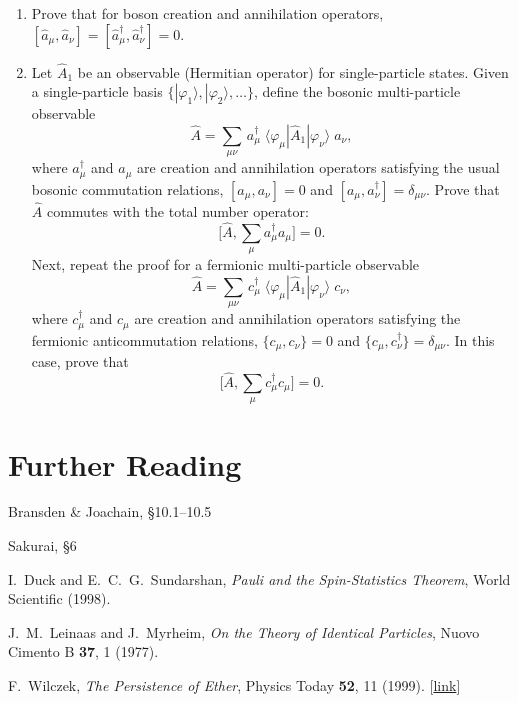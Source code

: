 \documentclass[prx,12pt]{revtex4-2}
\begin{document}
\begin{enumerate}
\item
  Prove that for boson creation and annihilation operators, $[\hat{a}_\mu,\hat{a}_\nu] = [\hat{a}_\mu^\dagger,\hat{a}_\nu^\dagger] = 0$.
  \label{ex:boson_commutators}

\item
  Let $\hat{A}_1$ be an observable (Hermitian operator) for
  single-particle states.  Given a single-particle basis
  $\{|\varphi_1\rangle,|\varphi_2\rangle,\dots\}$, define the
  bosonic multi-particle observable
  \begin{equation}
    \hat{A} = \sum_{\mu\nu} \,a^\dagger_\mu \; \langle\varphi_\mu|\hat{A}_1|\varphi_\nu\rangle \; a_\nu,
  \end{equation}
  where $a_\mu^\dagger$ and $a_\mu$ are creation and annihilation
  operators satisfying the usual bosonic commutation relations,
  $[a_\mu,a_\nu] = 0$ and $[a_\mu,a_\nu^\dagger] = \delta_{\mu\nu}$.
  Prove that $\hat{A}$ commutes with the total number operator:
  \begin{equation}
    \Big[\hat{A}, \sum_\mu a^\dagger_\mu a_\mu \Big] = 0.
  \end{equation}
  Next, repeat the proof for a fermionic multi-particle observable
  \begin{equation}
    \hat{A} = \sum_{\mu\nu} \,c^\dagger_\mu \; \langle\varphi_\mu|\hat{A}_1|\varphi_\nu\rangle \; c_\nu,
  \end{equation}
  where $c_\mu^\dagger$ and $c_\mu$ are creation and annihilation
  operators satisfying the fermionic anticommutation relations,
  $\{c_\mu,c_\nu\} = 0$ and $\{c_\mu,c_\nu^\dagger\} = \delta_{\mu\nu}$.
  In this case, prove that
  \begin{equation}
    \Big[\hat{A}, \sum_\mu c^\dagger_\mu c_\mu \Big] = 0.
  \end{equation}
  \label{ex:n_conserved}

\end{enumerate}

\section*{Further Reading}

\begin{enumerate}[[1{]}]
\item Bransden \& Joachain, \S10.1--10.5

\item Sakurai, \S6

\item I.~Duck and E.~C.~G.~Sundarshan, \textit{Pauli and the Spin-Statistics Theorem}, World Scientific (1998).
  \label{cite:duck}
  
\item J.~M.~Leinaas and J.~Myrheim, \textit{On the Theory of Identical Particles}, Nuovo Cimento B \textbf{37}, 1 (1977).
  \label{cite:leinaas}
  
\item F.~Wilczek, \textit{The Persistence of Ether}, Physics Today
  \textbf{52}, 11 (1999). [\href{http://physicstoday.scitation.org/doi/10.1063/1.882562}{link}]
\label{cite:wilczek}
\end{enumerate}
\end{document}
